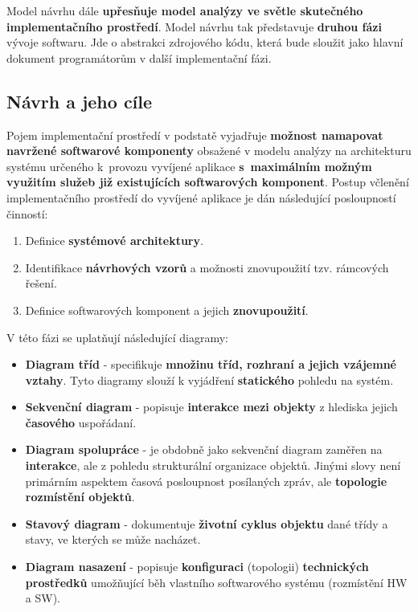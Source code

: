 Model návrhu dále \textbf{upřesňuje model analýzy ve světle skutečného implementačního prostředí}. Model návrhu tak představuje \textbf{druhou fázi} vývoje softwaru. Jde o abstrakci zdrojového kódu, která bude sloužit jako hlavní dokument programátorům v další implementační fázi.

\subsection{Návrh a jeho cíle}
Pojem implementační prostředí v podstatě vyjadřuje \textbf{možnost namapovat navržené softwarové komponenty} obsažené v modelu analýzy na architekturu systému určeného k provozu vyvíjené aplikace \textbf{s maximálním možným využitím služeb již existujících softwarových komponent}. Postup včlenění implementačního prostředí do vyvíjené aplikace je dán následující posloupností činností:
\begin{enumerate}
\item Definice \textbf{systémové architektury}.
\item Identifikace \textbf{návrhových vzorů} a možnosti znovupoužití tzv. rámcových řešení.
\item Definice softwarových komponent a jejich \textbf{znovupoužití}.
\end{enumerate}
V této fázi se uplatňují následující diagramy:

\begin{itemize}
\item \textbf{Diagram tříd} - specifikuje \textbf{množinu tříd, rozhraní a jejich vzájemné vztahy}. Tyto diagramy slouží k vyjádření \textbf{statického} pohledu na systém.
\item \textbf{Sekvenční diagram} - popisuje \textbf{interakce mezi objekty} z hlediska jejich \textbf{časového} uspořádaní.
\item \textbf{Diagram spolupráce} - je obdobně jako sekvenční diagram zaměřen na \textbf{interakce}, ale {z pohledu strukturální organizace objektů}. Jinými slovy není primárním aspektem časová posloupnost posílaných zpráv, ale \textbf{topologie rozmístění objektů}.
\item \textbf{Stavový diagram} - dokumentuje \textbf{životní cyklus objektu} dané třídy a stavy, ve kterých se může nacházet.
\item \textbf{Diagram nasazení} - popisuje \textbf{konfiguraci} (topologii) \textbf{technických prostředků} umožňující běh vlastního softwarového systému (rozmístění HW a SW).
\end{itemize}

